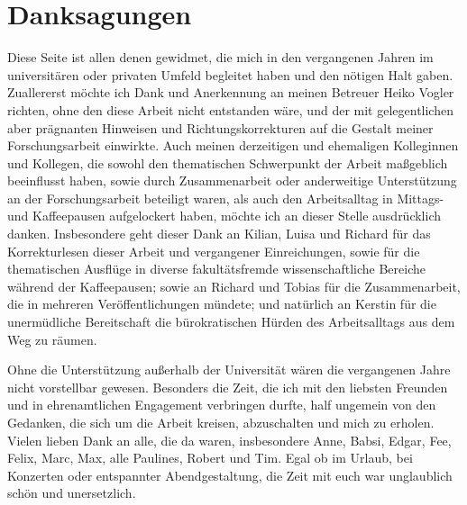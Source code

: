 \documentclass[document.tex]{subfiles}
\begin{document}
    \chapter*{Danksagungen}
    Diese Seite ist allen denen gewidmet, die mich in den vergangenen Jahren im universitären oder privaten Umfeld begleitet haben und den nötigen Halt gaben.
    Zuallererst möchte ich Dank und Anerkennung an meinen Betreuer Heiko Vogler richten, ohne den diese Arbeit nicht entstanden wäre, und der mit gelegentlichen aber prägnanten Hinweisen und Richtungskorrekturen auf die Gestalt meiner Forschungsarbeit einwirkte.
    Auch meinen derzeitigen und ehemaligen Kolleginnen und Kollegen, die sowohl den thematischen Schwerpunkt der Arbeit maßgeblich beeinflusst haben, sowie durch Zusammenarbeit oder anderweitige Unterstützung an der Forschungsarbeit beteiligt waren, als auch den Arbeitsalltag in Mittags- und Kaffeepausen aufgelockert haben, möchte ich an dieser Stelle ausdrücklich danken.
    Insbesondere geht dieser Dank an Kilian, Luisa und Richard für das Korrekturlesen dieser Arbeit und vergangener Einreichungen, sowie für die thematischen Ausflüge in diverse fakultätsfremde wissenschaftliche Bereiche während der Kaffeepausen; sowie an Richard und Tobias für die Zusammenarbeit, die in mehreren Veröffentlichungen mündete; und natürlich an Kerstin für die unermüdliche Bereitschaft die bürokratischen Hürden des Arbeitsalltags aus dem Weg zu räumen.

    Ohne die Unterstützung außerhalb der Universität wären die vergangenen Jahre nicht vorstellbar gewesen.
    Besonders die Zeit, die ich mit den liebsten Freunden und in ehrenamtlichen Engagement verbringen durfte, half ungemein von den Gedanken, die sich um die Arbeit kreisen, abzuschalten und mich zu erholen.
    Vielen lieben Dank an alle, die da waren, insbesondere Anne, Babsi, Edgar, Fee, Felix, Marc, Max, alle Paulines, Robert und Tim.
    Egal ob im Urlaub, bei Konzerten oder entspannter Abendgestaltung, die Zeit mit euch war unglaublich schön und unersetzlich.
\end{document}
